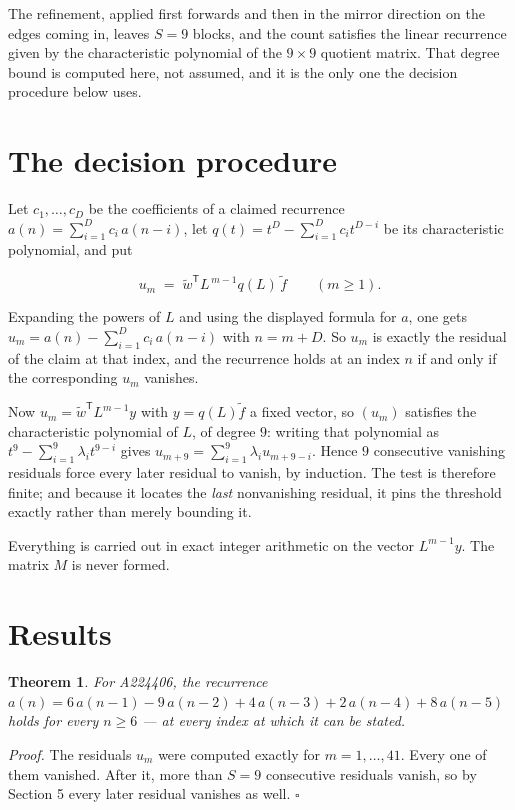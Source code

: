 \documentclass[11pt]{article}
\newtheorem{theorem}{Theorem}
\theoremstyle{definition}
\begin{document}
The refinement, applied first forwards and then in the mirror direction on the edges coming in, leaves $S = 9$ blocks, and the count satisfies the linear recurrence given by the characteristic polynomial of the $9 \times 9$ quotient matrix. That degree bound is computed here, not assumed, and it is the only one the decision procedure below uses.

\section{The decision procedure}

Let $c_1,\dots,c_D$ be the coefficients of a claimed recurrence $a(n) = \sum_{i=1}^{D} c_i\,a(n-i)$, let $q(t) = t^{D} - \sum_{i=1}^{D} c_i t^{D-i}$ be its characteristic polynomial, and put

\[u_m \;=\; \tilde w^{\mathsf T} L^{\,m-1} q(L)\,\tilde f \qquad (m \ge 1).\]

Expanding the powers of $L$ and using the displayed formula for $a$, one gets $u_m = a(n) - \sum_{i=1}^{D} c_i\,a(n-i)$ with $n = m + D$. So $u_m$ is exactly the residual of the claim at that index, and the recurrence holds at an index $n$ if and only if the corresponding $u_m$ vanishes.

Now $u_m = \tilde w^{\mathsf T} L^{m-1} y$ with $y = q(L)\tilde f$ a fixed vector, so $(u_m)$ satisfies the characteristic polynomial of $L$, of degree $9$: writing that polynomial as $t^{9} - \sum_{i=1}^{9} \lambda_i t^{9-i}$ gives $u_{m+9} = \sum_{i=1}^{9} \lambda_i u_{m+9-i}$. Hence $9$ consecutive vanishing residuals force every later residual to vanish, by induction. The test is therefore finite; and because it locates the {\itshape last} nonvanishing residual, it pins the threshold exactly rather than merely bounding it.

Everything is carried out in exact integer arithmetic on the vector $L^{m-1}y$. The matrix $M$ is never formed.

\section{Results}

\begin{theorem} For A224406, the recurrence $a(n) = 6\,a(n-1) - 9\,a(n-2) + 4\,a(n-3) + 2\,a(n-4) + 8\,a(n-5)$ holds for every $n \ge 6$ --- at every index at which it can be stated.\end{theorem}

{\itshape Proof.} The residuals $u_m$ were computed exactly for $m = 1,\dots,41$. Every one of them vanished. After it, more than $S = 9$ consecutive residuals vanish, so by Section 5 every later residual vanishes as well. $\square$
\end{document}
